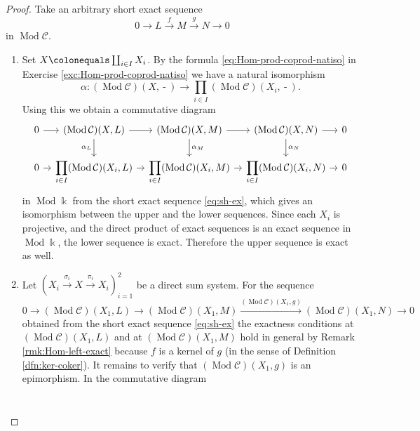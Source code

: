\documentclass{surv-l}
\numberwithin{equation}{chapter}
\numberwithin{figure}{chapter}
\theoremstyle{plain}
\theoremstyle{definition}
\theoremstyle{remark}
\newcommand{\Ar}[3]{\ar[from={#1}, to={#2}, #3]}
\DeclareMathOperator{\Mod}{Mod}
\DeclareMathOperator{\blank}{-}
\begin{document}
\begin{proof}
Take an arbitrary short exact sequence
\begin{equation}\label{eq:sh-ex}
0 \to L \xrightarrow{f} M \xrightarrow{g} N \to 0
\end{equation}
in $\Mod{\mathcal{C}}$.
\begin{enumerate}[wide]
\item Set $X\colonequals \coprod_{i \in I} X_i$.
By the formula \eqref{eq:Hom-prod-coprod-natiso}
in Exercise \ref{exc:Hom-prod-coprod-natiso} we have a natural isomorphism
\[
\alpha \colon (\Mod{\mathcal{C}})(X, \blank) \to \prod_{i\in I}(\Mod{\mathcal{C}})(X_i, \blank).
\]
Using this we obtain a commutative diagram
\begin{equation*}
\begin{tikzcd}[column sep=8pt]
0 & (\Mod{\mathcal{C}})(X, L)  & (\Mod{\mathcal{C}})(X, M) & (\Mod{\mathcal{C}})(X, N) & 0\\
0 & \displaystyle\prod_{i\in I}(\Mod{\mathcal{C}})(X_i, L)  & \displaystyle\prod_{i\in I}(\Mod{\mathcal{C}})(X_i, M) & \displaystyle\prod_{i\in I}(\Mod{\mathcal{C}})(X_i, N) & 0
\Ar{1-1}{1-2}{}
\Ar{1-2}{1-3}{}
\Ar{1-3}{1-4}{}
\Ar{1-4}{1-5}{}
\Ar{2-1}{2-2}{}
\Ar{2-2}{2-3}{}
\Ar{2-3}{2-4}{}
\Ar{2-4}{2-5}{}
\Ar{1-2}{2-2}{"\alpha_L" '}
\Ar{1-3}{2-3}{"\alpha_M"}
\Ar{1-4}{2-4}{"\alpha_N"}
\end{tikzcd}
\end{equation*}
in $\Mod \Bbbk$ from the short exact sequence \eqref{eq:sh-ex},
which gives an isomorphism between the upper and the lower sequences.
Since each $X_i$ is projective, and the direct product of exact sequences
is an exact sequence in $\Mod \Bbbk$,
the lower sequence is exact.
Therefore the upper sequence is exact as well.
\item Let $(X_i \xrightarrow{\sigma_i} X \xrightarrow{\pi_i} X_i)_{i=1}^2$ be a direct sum system.
For the sequence
\[
0 \to (\Mod{\mathcal{C}})(X_1,L) \to (\Mod{\mathcal{C}})(X_1,M)
\xrightarrow{(\Mod{\mathcal{C}})(X_1,g)} (\Mod{\mathcal{C}})(X_1,N) \to 0
\]
obtained from the short exact sequence \eqref{eq:sh-ex}
the exactness conditions at
$(\Mod{\mathcal{C}})$\linebreak[2]$(X_1,L)$ and at $(\Mod{\mathcal{C}})(X_1,M)$ hold in general
by Remark \ref{rmk:Hom-left-exact}
because $f$ is a kernel of $g$ (in the sense of Definition \ref{dfn:ker-coker}).
It remains to verify that $(\Mod{\mathcal{C}})(X_1,g)$ is an epimorphism.
In the commutative diagram
\[
\begin{tikzcd}[column sep=6em]

\end{tikzcd}\]
\end{enumerate}
\end{proof}
\end{document}
